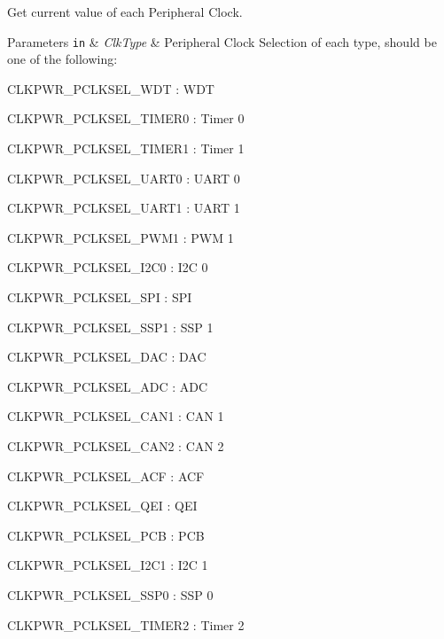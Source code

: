 \-Get current value of each \-Peripheral \-Clock. 


\begin{DoxyParams}[1]{\-Parameters}
\mbox{\tt in}  & {\em \-Clk\-Type} & \-Peripheral \-Clock \-Selection of each type, should be one of the following\-:
\begin{DoxyItemize}
\item \-C\-L\-K\-P\-W\-R\-\_\-\-P\-C\-L\-K\-S\-E\-L\-\_\-\-W\-D\-T \-: \-W\-D\-T
\item \-C\-L\-K\-P\-W\-R\-\_\-\-P\-C\-L\-K\-S\-E\-L\-\_\-\-T\-I\-M\-E\-R0 \-: \-Timer 0
\item \-C\-L\-K\-P\-W\-R\-\_\-\-P\-C\-L\-K\-S\-E\-L\-\_\-\-T\-I\-M\-E\-R1 \-: \-Timer 1
\item \-C\-L\-K\-P\-W\-R\-\_\-\-P\-C\-L\-K\-S\-E\-L\-\_\-\-U\-A\-R\-T0 \-: \-U\-A\-R\-T 0
\item \-C\-L\-K\-P\-W\-R\-\_\-\-P\-C\-L\-K\-S\-E\-L\-\_\-\-U\-A\-R\-T1 \-: \-U\-A\-R\-T 1
\item \-C\-L\-K\-P\-W\-R\-\_\-\-P\-C\-L\-K\-S\-E\-L\-\_\-\-P\-W\-M1 \-: \-P\-W\-M 1
\item \-C\-L\-K\-P\-W\-R\-\_\-\-P\-C\-L\-K\-S\-E\-L\-\_\-\-I2\-C0 \-: \-I2\-C 0
\item \-C\-L\-K\-P\-W\-R\-\_\-\-P\-C\-L\-K\-S\-E\-L\-\_\-\-S\-P\-I \-: \-S\-P\-I
\item \-C\-L\-K\-P\-W\-R\-\_\-\-P\-C\-L\-K\-S\-E\-L\-\_\-\-S\-S\-P1 \-: \-S\-S\-P 1
\item \-C\-L\-K\-P\-W\-R\-\_\-\-P\-C\-L\-K\-S\-E\-L\-\_\-\-D\-A\-C \-: \-D\-A\-C
\item \-C\-L\-K\-P\-W\-R\-\_\-\-P\-C\-L\-K\-S\-E\-L\-\_\-\-A\-D\-C \-: \-A\-D\-C
\item \-C\-L\-K\-P\-W\-R\-\_\-\-P\-C\-L\-K\-S\-E\-L\-\_\-\-C\-A\-N1 \-: \-C\-A\-N 1
\item \-C\-L\-K\-P\-W\-R\-\_\-\-P\-C\-L\-K\-S\-E\-L\-\_\-\-C\-A\-N2 \-: \-C\-A\-N 2
\item \-C\-L\-K\-P\-W\-R\-\_\-\-P\-C\-L\-K\-S\-E\-L\-\_\-\-A\-C\-F \-: \-A\-C\-F
\item \-C\-L\-K\-P\-W\-R\-\_\-\-P\-C\-L\-K\-S\-E\-L\-\_\-\-Q\-E\-I \-: \-Q\-E\-I
\item \-C\-L\-K\-P\-W\-R\-\_\-\-P\-C\-L\-K\-S\-E\-L\-\_\-\-P\-C\-B \-: \-P\-C\-B
\item \-C\-L\-K\-P\-W\-R\-\_\-\-P\-C\-L\-K\-S\-E\-L\-\_\-\-I2\-C1 \-: \-I2\-C 1
\item \-C\-L\-K\-P\-W\-R\-\_\-\-P\-C\-L\-K\-S\-E\-L\-\_\-\-S\-S\-P0 \-: \-S\-S\-P 0
\item \-C\-L\-K\-P\-W\-R\-\_\-\-P\-C\-L\-K\-S\-E\-L\-\_\-\-T\-I\-M\-E\-R2 \-: \-Timer 2

\end{DoxyItemize}
\end{DoxyParams}
